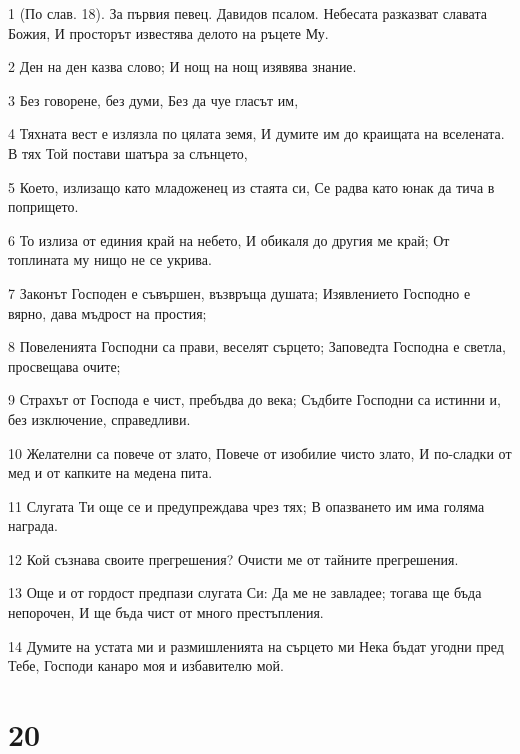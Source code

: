 \par 1 (По слав. 18). За първия певец. Давидов псалом. Небесата разказват славата Божия, И просторът известява делото на ръцете Му.
\par 2 Ден на ден казва слово; И нощ на нощ изявява знание.
\par 3 Без говорене, без думи, Без да чуе гласът им,
\par 4 Тяхната вест е излязла по цялата земя, И думите им до краищата на вселената. В тях Той постави шатъра за слънцето,
\par 5 Което, излизащо като младоженец из стаята си, Се радва като юнак да тича в попрището.
\par 6 То излиза от единия край на небето, И обикаля до другия ме край; От топлината му нищо не се укрива.
\par 7 Законът Господен е съвършен, възвръща душата; Изявлението Господно е вярно, дава мъдрост на простия;
\par 8 Повеленията Господни са прави, веселят сърцето; Заповедта Господна е светла, просвещава очите;
\par 9 Страхът от Господа е чист, пребъдва до века; Съдбите Господни са истинни и, без изключение, справедливи.
\par 10 Желателни са повече от злато, Повече от изобилие чисто злато, И по-сладки от мед и от капките на медена пита.
\par 11 Слугата Ти още се и предупреждава чрез тях; В опазването им има голяма награда.
\par 12 Кой съзнава своите прегрешения? Очисти ме от тайните прегрешения.
\par 13 Още и от гордост предпази слугата Си: Да ме не завладее; тогава ще бъда непорочен, И ще бъда чист от много престъпления.
\par 14 Думите на устата ми и размишленията на сърцето ми Нека бъдат угодни пред Тебе, Господи канаро моя и избавителю мой.

\chapter{20}

